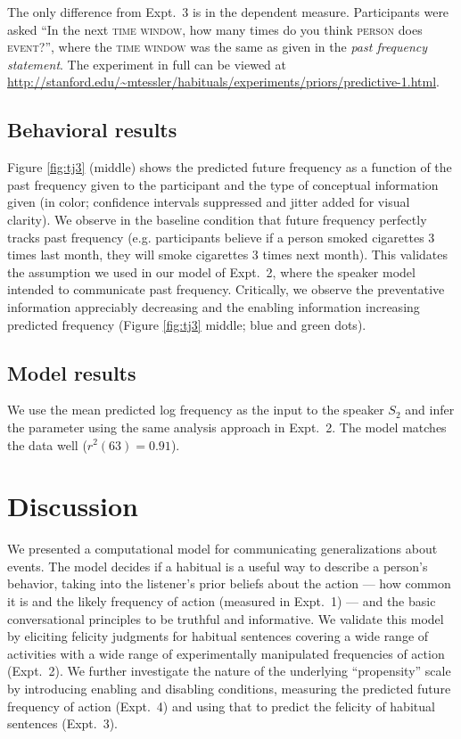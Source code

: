 \documentclass[10pt,letterpaper]{article}
\begin{document}
The only difference from Expt.~3 is in the dependent measure.
Participants were asked ``In the next \textsc{time window}, how many times do you think \textsc{person} does \textsc{event}?'', where the \textsc{time window} was the same as given in the \emph{past frequency statement}.
The experiment in full can be viewed at \url{http://stanford.edu/~mtessler/habituals/experiments/priors/predictive-1.html}.

\subsection{Behavioral results}

Figure \ref{fig:tj3} (middle) shows the predicted future frequency as a function of the past frequency given to the participant and the type of conceptual information given (in color; confidence intervals suppressed and jitter added for visual clarity). 
We observe in the baseline condition that future frequency perfectly tracks past frequency (e.g. participants believe if a person smoked cigarettes 3 times last month, they will smoke cigarettes 3 times next month). 
This validates the assumption we used in our model of Expt.~2, where the speaker model intended to communicate past frequency.
Critically, we observe the preventative information appreciably decreasing and the enabling information increasing predicted frequency (Figure \ref{fig:tj3} middle; blue and green dots).

\subsection{Model results}

We use the mean predicted log frequency as the input to the speaker $S_2$ and infer the parameter using the same analysis approach in Expt.~2. 
The model matches the data well ($r^2(63) = 0.91$).

\section{Discussion}

We presented a computational model for communicating generalizations about events.
The model decides if a habitual is a useful way to describe a person's behavior, taking into the listener's prior beliefs about the action --- how common it is and the likely frequency of action (measured in Expt.~1) --- and the basic conversational principles to be truthful and informative.
We validate this model by eliciting felicity judgments for habitual sentences covering a wide range of activities with a wide range of experimentally manipulated frequencies of action (Expt.~2).
We further investigate the nature of the underlying ``propensity'' scale by introducing enabling and disabling conditions, measuring the predicted future frequency of action (Expt.~4) and using that to predict the felicity of habitual sentences (Expt.~3). 
\end{document}
